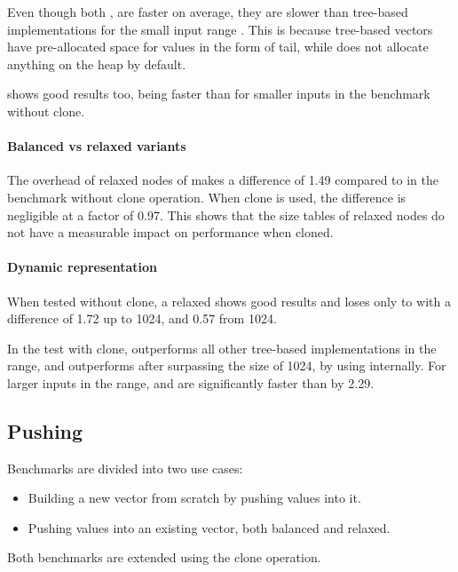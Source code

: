 Even though both \stdvec{}, \pvec{} are faster on average, they are slower than tree-based implementations for the small input range \range{[10, 100]}. This is because tree-based vectors have pre-allocated space for values in the form of tail, while \stdvec{} does not allocate anything on the heap by default. 

\imrsvec{} shows good results too, being faster than \rrbvec{} for smaller inputs in the benchmark without clone. 

\paragraph{Balanced vs relaxed variants}
The overhead of relaxed nodes of \rrbtree{} makes a difference of 1.49 compared to \rbtree{} in the benchmark without clone operation. When clone is used, the difference is negligible at a factor of 0.97. This shows that the size tables of relaxed nodes do not have a measurable impact on performance when cloned.

\paragraph{Dynamic representation}
When tested without clone, a relaxed \pvec{} shows good results and loses only to \stdvec{} with a difference of 1.72 up to 1024, and 0.57 from 1024.

In the test with clone, \pvec{} outperforms all other tree-based implementations in the \range{[100, \kilo{1}]} range, and outperforms \stdvec{} after surpassing the size of 1024, by using \rrbvec{} internally. For larger inputs in the  range, \pvec{} and \rrbvec{} are significantly faster than \stdvec{} by 2.29. 

\subsection{Pushing}
Benchmarks are divided into two use cases:
\begin{itemize}
    \item Building a new vector from scratch by pushing values into it. 
    \item Pushing values into an existing vector, both balanced and relaxed. 
\end{itemize}

Both benchmarks are extended using the clone operation. 

